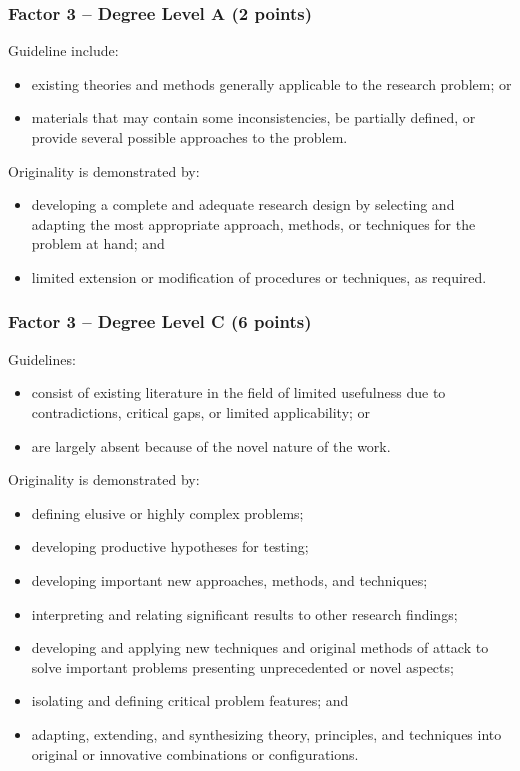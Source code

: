 \subsubsection*{Factor 3 -- Degree Level A (2 points)}

Guideline include:
\begin{itemize}
  \item existing theories and methods generally applicable to the research problem; or
  \item materials that may contain some inconsistencies, be partially defined, or provide several possible approaches to the problem. 
\end{itemize}

Originality is demonstrated by:
\begin{itemize}
  \item developing a complete and adequate research design by selecting and adapting the most appropriate approach, methods, or techniques for the problem at hand; and
  \item limited extension or modification of procedures or techniques, as required.
\end{itemize}

\subsubsection*{Factor 3 -- Degree Level C (6 points)}

Guidelines:
\begin{itemize}
  \item consist of existing literature in the field of limited usefulness due to contradictions, critical 
  gaps, or limited applicability; or
  \item are largely absent because of the novel nature of the work. 
\end{itemize}

Originality is demonstrated by:
\begin{itemize}
  \item defining elusive or highly complex problems;
  \item developing productive hypotheses for testing;
  \item developing important new approaches, methods, and techniques;
  \item interpreting and relating significant results to other research findings; 
  \item developing and applying new techniques and original methods of attack to solve important problems presenting unprecedented or novel aspects;
  \item isolating and defining critical problem features; and
  \item adapting, extending, and synthesizing theory, principles, and techniques into original or innovative combinations or configurations. 
\end{itemize}

